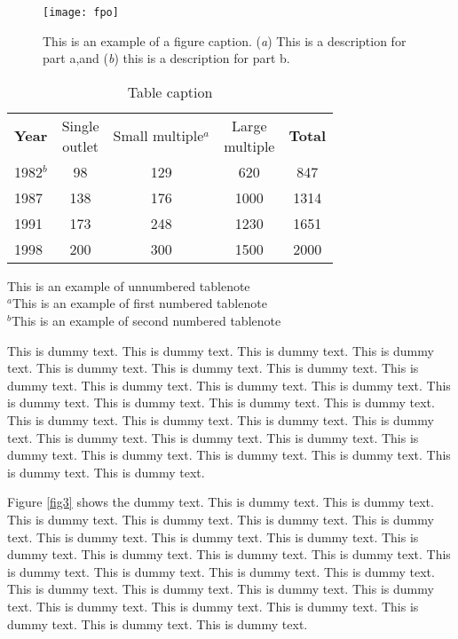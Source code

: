 \documentclass{aer}      %
\begin{document}
\begin{figure}
\begin{center}
\texttt{[image: fpo]}%
\end{center}
\caption{This is an example of a figure caption. (\textit{a}) This is a description for part a,\break and (\textit{b}) this is a description for part b.}\label{fig2}
\end{figure}

\begin{table}[tbp]
\caption{Table caption}
\label{tab1}
\centering
\begin{tabular}{lcccc}
    \textbf{Year}
  & \tch{1}{c}{b}{Single\\ outlet}  
  & \tch{1}{c}{b}{Small\\ multiple$^{a}$}  
  & \tch{1}{c}{b}{Large\\ multiple}  
  & \textbf{Total}   \\[6pt]
1982$^{b}$ & 98  & 129 & 620    & 847\\
1987 & 138 & 176 & 1000  & 1314\\
1991 & 173 & 248 & 1230  & 1651\\
1998 & 200 & 300 & 1500  & 2000\\
\end{tabular}
\begin{tabnote}
This is an example of unnumbered tablenote\\
$^{a}$This is an example of first numbered tablenote\\
$^{b}$This is an example of second numbered tablenote\\
\end{tabnote}
\end{table}


This is dummy text. This is dummy text. This is dummy text. This is dummy text. This is dummy text. This is dummy text. This is dummy text. This is dummy text. This is dummy text. This is dummy text. This is dummy text. This is dummy text. This is dummy text. This is dummy text. This is dummy text. This is dummy text. This is dummy text. This is dummy text. This is dummy text. This is dummy text. This is dummy text. This is dummy text. This is dummy text. This is dummy text. This is dummy text. This is dummy text. This is dummy text. This is dummy text.

Figure \ref{fig3} shows the dummy text. This is dummy text. This is dummy text. This is dummy text. This is dummy text. This is dummy text. This is dummy text. This is dummy text. This is dummy text. This is dummy text. This is dummy text. This is dummy text. This is dummy text. This is dummy text. This is dummy text. This is dummy text. This is dummy text. This is dummy text. This is dummy text. This is dummy text. This is dummy text. This is dummy text. This is dummy text. This is dummy text. This is dummy text. This is dummy text. This is dummy text. This is dummy text.
\end{document}
